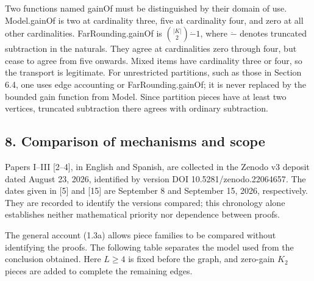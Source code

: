 \documentclass[english,11pt,a4paper]{article}
\begin{document}
Two functions named {\ttfamily\small gainOf} must be distinguished by their domain of use. {\ttfamily\small Model.\discretionary{\hbox{\ensuremath{\hookrightarrow}}}{}{}gainOf} is two at cardinality three, five at cardinality four, and zero at all other cardinalities. {\ttfamily\small FarRounding.\discretionary{\hbox{\ensuremath{\hookrightarrow}}}{}{}gainOf} is \(\binom{|K|}{2}\mathbin{\dot-}1\), where \(\dot-\) denotes truncated subtraction in the naturals. They agree at cardinalities zero through four, but cease to agree from five onwards. Mixed items have cardinality three or four, so the transport is legitimate. For unrestricted partitions, such as those in Section 6.4, one uses edge accounting or {\ttfamily\small FarRounding.\discretionary{\hbox{\ensuremath{\hookrightarrow}}}{}{}gainOf}; it is never replaced by the bounded gain function from {\ttfamily\small Model}. Since partition pieces have at least two vertices, truncated subtraction there agrees with ordinary subtraction.

\subsection{8. Comparison of mechanisms and scope}\label{comparison-of-mechanisms-and-scope}

Papers I--III {[}2--4{]}, in English and Spanish, are collected in the Zenodo v3 deposit dated August 23, 2026, identified by version DOI {\ttfamily\small 10.\discretionary{\hbox{\ensuremath{\hookrightarrow}}}{}{}5281/\discretionary{\hbox{\ensuremath{\hookrightarrow}}}{}{}zenodo.\discretionary{\hbox{\ensuremath{\hookrightarrow}}}{}{}22064657}. The dates given in {[}5{]} and {[}15{]} are September 8 and September 15, 2026, respectively. They are recorded to identify the versions compared; this chronology alone establishes neither mathematical priority nor dependence between proofs.

The general account (1.3a) allows piece families to be compared without identifying the proofs. The following table separates the model used from the conclusion obtained. Here \(L\ge4\) is fixed before the graph, and zero-gain \(K_2\) pieces are added to complete the remaining edges.

\end{document}
